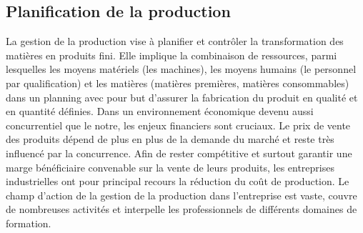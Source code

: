 \subsection{Planification de la production}

La gestion de la production vise à planifier et contrôler la transformation des matières en produits fini. Elle implique la combinaison de ressources, parmi lesquelles les moyens matériels (les machines), les moyens humains (le personnel par qualification) et les matières (matières premières, matières consommables) dans un planning avec pour but d'assurer la fabrication du produit en qualité et en quantité définies. Dans un environnement économique devenu aussi concurrentiel que le notre, les enjeux financiers sont cruciaux. Le prix de vente des produits dépend de plus en plus de la demande du marché et reste très influencé par la concurrence. Afin de rester compétitive et surtout garantir une marge bénéficiaire convenable sur la vente de leurs produits, les entreprises industrielles ont pour principal recours la réduction du coût de production. Le champ d'action de la gestion de la production dans l'entreprise est vaste, couvre de nombreuses activités et interpelle les professionnels de différents domaines de formation.


